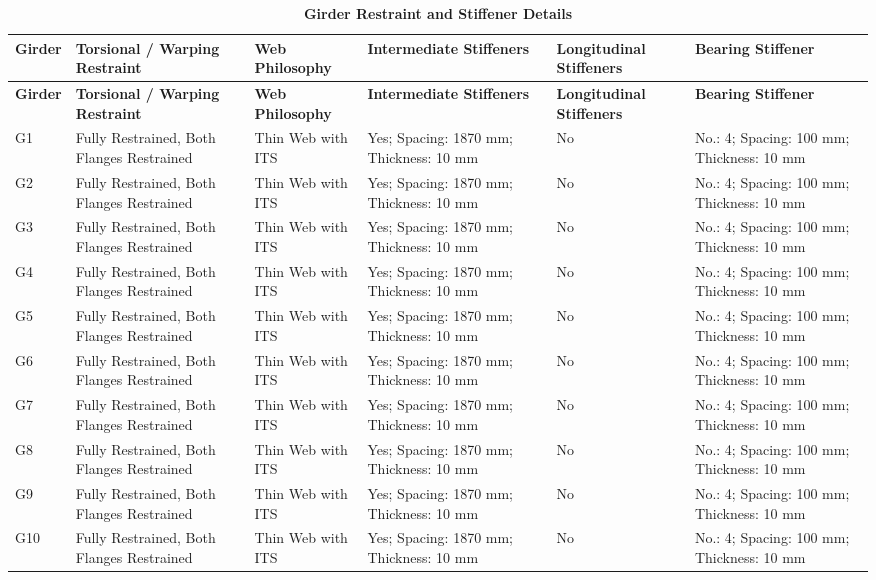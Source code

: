 \documentclass[12pt,a4paper]{report}
\numberwithin{table}{chapter}
\numberwithin{figure}{chapter}
\begin{document}
\vspace{4pt}
\begin{longtable}{|L{1.4cm}|p{2.2cm}|p{2.2cm}|p{3.0cm}|p{2.4cm}|p{2.2cm}|}
\caption{\textbf{Girder Restraint and Stiffener Details}}\\
\hline
\textbf{Girder} & \textbf{Torsional / Warping Restraint} & \textbf{Web Philosophy} & \textbf{Intermediate Stiffeners} & \textbf{Longitudinal Stiffeners} & \textbf{Bearing Stiffener} \\[6pt]
\hline
\endfirsthead
\hline
\textbf{Girder} & \textbf{Torsional / Warping Restraint} & \textbf{Web Philosophy} & \textbf{Intermediate Stiffeners} & \textbf{Longitudinal Stiffeners} & \textbf{Bearing Stiffener} \\[6pt]
\hline
\endhead
G1 & Fully Restrained, Both Flanges Restrained & Thin Web with ITS & Yes; Spacing: 1870 mm; Thickness: 10 mm & No & No.: 4; Spacing: 100 mm; Thickness: 10 mm \\[8pt]
\hline
G2 & Fully Restrained, Both Flanges Restrained & Thin Web with ITS & Yes; Spacing: 1870 mm; Thickness: 10 mm & No & No.: 4; Spacing: 100 mm; Thickness: 10 mm \\[8pt]
\hline
G3 & Fully Restrained, Both Flanges Restrained & Thin Web with ITS & Yes; Spacing: 1870 mm; Thickness: 10 mm & No & No.: 4; Spacing: 100 mm; Thickness: 10 mm \\[8pt]
\hline
G4 & Fully Restrained, Both Flanges Restrained & Thin Web with ITS & Yes; Spacing: 1870 mm; Thickness: 10 mm & No & No.: 4; Spacing: 100 mm; Thickness: 10 mm \\[8pt]
\hline
G5 & Fully Restrained, Both Flanges Restrained & Thin Web with ITS & Yes; Spacing: 1870 mm; Thickness: 10 mm & No & No.: 4; Spacing: 100 mm; Thickness: 10 mm \\[8pt]
\hline
G6 & Fully Restrained, Both Flanges Restrained & Thin Web with ITS & Yes; Spacing: 1870 mm; Thickness: 10 mm & No & No.: 4; Spacing: 100 mm; Thickness: 10 mm \\[8pt]
\hline
G7 & Fully Restrained, Both Flanges Restrained & Thin Web with ITS & Yes; Spacing: 1870 mm; Thickness: 10 mm & No & No.: 4; Spacing: 100 mm; Thickness: 10 mm \\[8pt]
\hline
G8 & Fully Restrained, Both Flanges Restrained & Thin Web with ITS & Yes; Spacing: 1870 mm; Thickness: 10 mm & No & No.: 4; Spacing: 100 mm; Thickness: 10 mm \\[8pt]
\hline
G9 & Fully Restrained, Both Flanges Restrained & Thin Web with ITS & Yes; Spacing: 1870 mm; Thickness: 10 mm & No & No.: 4; Spacing: 100 mm; Thickness: 10 mm \\[8pt]
\hline
G10 & Fully Restrained, Both Flanges Restrained & Thin Web with ITS & Yes; Spacing: 1870 mm; Thickness: 10 mm & No & No.: 4; Spacing: 100 mm; Thickness: 10 mm \\[8pt]
\hline
\end{longtable}
\end{document}

